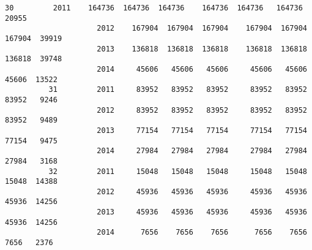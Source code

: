 \documentclass[11pt]{article}
\begin{document}
\begin{Verbatim}[commandchars=\\\{\}]
          30         2011    164736  164736  164736    164736  164736   164736  20955   
                     2012    167904  167904  167904    167904  167904   167904  39919   
                     2013    136818  136818  136818    136818  136818   136818  39748   
                     2014     45606   45606   45606     45606   45606    45606  13522   
          31         2011     83952   83952   83952     83952   83952    83952   9246   
                     2012     83952   83952   83952     83952   83952    83952   9489   
                     2013     77154   77154   77154     77154   77154    77154   9475   
                     2014     27984   27984   27984     27984   27984    27984   3168   
          32         2011     15048   15048   15048     15048   15048    15048  14388   
                     2012     45936   45936   45936     45936   45936    45936  14256   
                     2013     45936   45936   45936     45936   45936    45936  14256   
                     2014      7656    7656    7656      7656    7656     7656   2376   
          

\end{Verbatim}
\end{document}
